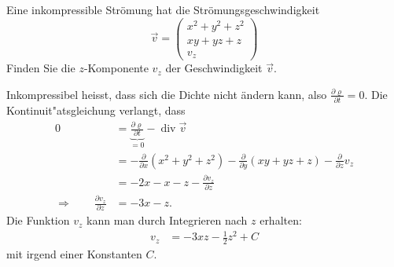 Eine inkompressible Strömung hat die Strömungsgeschwindigkeit
\[
\vec v = \begin{pmatrix}
x^2+y^2+z^2
\\
xy+yz+z
\\
v_z
\end{pmatrix}
\]
Finden Sie die $z$-Komponente $v_z$ der Geschwindigkeit $\vec v$.

\begin{loesung}
Inkompressibel heisst, dass sich die Dichte nicht ändern kann, also
$\frac{\partial\varrho}{\partial t}=0$.
Die Kontinuit"atsgleichung verlangt, dass
\begin{align*}
0
&=
\underbrace{\frac{\partial\varrho}{\partial t}}_{=0}-\operatorname{div}\vec v
\\
&=
-\frac{\partial}{\partial x}(x^2+y^2+z^2)
-\frac{\partial}{\partial y}(xy+yz+z)
-\frac{\partial}{\partial z}v_z
\\
&=
-2x-x-z-\frac{\partial v_z}{\partial z}
\\
\Rightarrow
\qquad
\frac{\partial v_z}{\partial z}
&=
-3x-z.
\end{align*}
Die Funktion $v_z$ kann man durch Integrieren nach $z$ erhalten:
\begin{align*}
v_z
&=
-3xz-\frac12z^2+C
\end{align*}
mit irgend einer Konstanten $C$.
\end{loesung}

